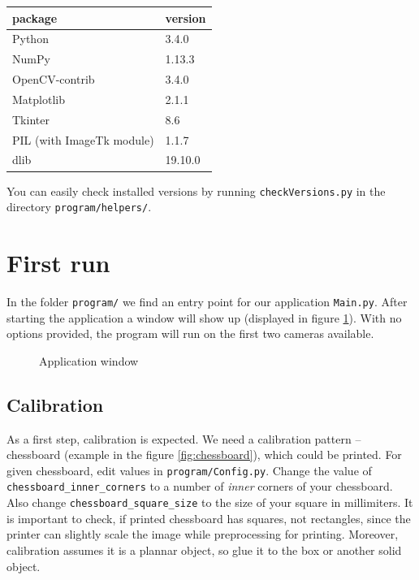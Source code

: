 \begin{center}
\begin{tabular}{l l}
	package	&	version 	\\ \hline
	Python	&	3.4.0 		\\
	NumPy	&	1.13.3 		\\
	OpenCV-contrib	&	3.4.0 	\\ 
	Matplotlib &	2.1.1 		\\
	Tkinter	&	8.6 		\\
	PIL (with ImageTk module)	&	1.1.7 		\\
	dlib	&	19.10.0
\end{tabular}
\end{center}

You can easily check installed versions by running \verb+checkVersions.py+ in
the directory \verb+program/helpers/+.

\section{First run}

In the folder \verb+program/+ we find an entry point for our application
\verb+Main.py+. After starting the application a window will show up (displayed
in figure \ref{fig:application}). With no options provided, the program will
run on the first two cameras available.

\begin{figure}
	\label{fig:application}
	\caption{Application window}
\end{figure}

\subsection{Calibration}
As a first step, calibration is expected. We need a calibration pattern --
chessboard (example in the figure \ref{fig:chessboard}), which could be
printed. For given chessboard, edit values in \verb+program/Config.py+. Change
the value of \verb+chessboard_inner_corners+ to a number of \emph{inner}
corners of your chessboard. Also change \verb+chessboard_square_size+ to the
size of your square in millimiters. It is important to check, if printed
chessboard has squares, not rectangles, since the printer can slightly scale
the image while preprocessing for printing. Moreover, calibration assumes it is
a plannar object, so glue it to the box or another solid object.

